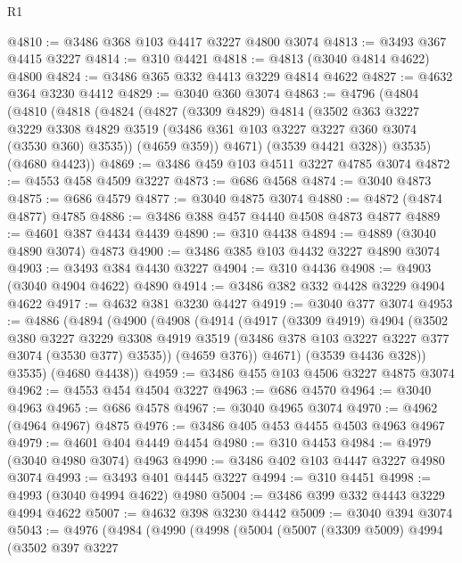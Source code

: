\begin{lexlean}{R1}
\begin{coremodule}
@4810 := @3486 @368 @103 @4417 @3227 @4800 @3074
@4813 := @3493 @367 @4415 @3227
@4814 := @310 @4421
@4818 := @4813 (@3040 @4814 @4622) @4800
@4824 := @3486 @365 @332 @4413 @3229 @4814 @4622
@4827 := @4632 @364 @3230 @4412
@4829 := @3040 @360 @3074
@4863 := @4796
    (@4804
      (@4810
        (@4818
          (@4824
            (@4827
              (@3309 @4829)
              @4814
              (@3502
                @363
                @3227
                @3229
                @3308
                @4829
                @3519
                (@3486 @361 @103 @3227 @3227 @360 @3074 (@3530 @360) @3535))
              (@4659 @359))
            @4671)
          (@3539 @4421 @328))
        @3535)
      (@4680 @4423))
@4869 := @3486 @459 @103 @4511 @3227 @4785 @3074
@4872 := @4553 @458 @4509 @3227
@4873 := @686 @4568
@4874 := @3040 @4873
@4875 := @686 @4579
@4877 := @3040 @4875 @3074
@4880 := @4872 (@4874 @4877) @4785
@4886 := @3486 @388 @457 @4440 @4508 @4873 @4877
@4889 := @4601 @387 @4434 @4439
@4890 := @310 @4438
@4894 := @4889 (@3040 @4890 @3074) @4873
@4900 := @3486 @385 @103 @4432 @3227 @4890 @3074
@4903 := @3493 @384 @4430 @3227
@4904 := @310 @4436
@4908 := @4903 (@3040 @4904 @4622) @4890
@4914 := @3486 @382 @332 @4428 @3229 @4904 @4622
@4917 := @4632 @381 @3230 @4427
@4919 := @3040 @377 @3074
@4953 := @4886
    (@4894
      (@4900
        (@4908
          (@4914
            (@4917
              (@3309 @4919)
              @4904
              (@3502
                @380
                @3227
                @3229
                @3308
                @4919
                @3519
                (@3486 @378 @103 @3227 @3227 @377 @3074 (@3530 @377) @3535))
              (@4659 @376))
            @4671)
          (@3539 @4436 @328))
        @3535)
      (@4680 @4438))
@4959 := @3486 @455 @103 @4506 @3227 @4875 @3074
@4962 := @4553 @454 @4504 @3227
@4963 := @686 @4570
@4964 := @3040 @4963
@4965 := @686 @4578
@4967 := @3040 @4965 @3074
@4970 := @4962 (@4964 @4967) @4875
@4976 := @3486 @405 @453 @4455 @4503 @4963 @4967
@4979 := @4601 @404 @4449 @4454
@4980 := @310 @4453
@4984 := @4979 (@3040 @4980 @3074) @4963
@4990 := @3486 @402 @103 @4447 @3227 @4980 @3074
@4993 := @3493 @401 @4445 @3227
@4994 := @310 @4451
@4998 := @4993 (@3040 @4994 @4622) @4980
@5004 := @3486 @399 @332 @4443 @3229 @4994 @4622
@5007 := @4632 @398 @3230 @4442
@5009 := @3040 @394 @3074
@5043 := @4976
    (@4984
      (@4990
        (@4998
          (@5004
            (@5007
              (@3309 @5009)
              @4994
              (@3502
                @397
                @3227

\end{coremodule}
\end{lexlean}
